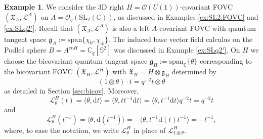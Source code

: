 \documentclass{article}
\theoremstyle{definition}
\newtheorem{example}[thm]{Example}
\newcommand{\fg}{{\mathfrak{g}}}
\begin{document}
\begin{example}
	We consider the 3D right $H=\mathcal{O}(U(1))$-covariant FOVC $(\mathfrak{X}_A,\mathscr{L}^A)$ on $A=\mathcal{O}_q(\mathrm{SL}_2(\mathbb{C}))$, as discussed in Examples \ref{ex:SL2:FOVC} and \ref{ex:SLq2'}. Recall that $(\mathfrak{X}_A,\mathscr{L}^A)$ is also a left $A$-covariant FOVC with quantum tangent space $\fg_A:=\mathrm{span}\{\chi_0,\chi_{\pm}\}$. The induced base vector field calculus on the Podle\'s sphere $B=A^{\mathrm{co}H}=\mathbb{C}_q[\mathbb{S}^2]$ was discussed in Example \ref{ex:SLq2'}. On $H$ we choose the bicovariant quantum tangent space $\mathfrak{g}_H:=\mathrm{span}_\mathbb{C}\{\theta\}$ corresponding to the bicovariant FOVC $(\mathfrak{X}_H,\mathscr{L}^H)$ with $\mathfrak{X}_H=H\otimes\mathfrak{g}_H$ determined by
	$$
	(1\otimes\theta)\cdot t=q^{-2}t\otimes\theta
	$$ 
	as detailed in Section \ref{sec:bicov}.
	Moreover, 
	$$
	\mathscr{L}^H_\theta(t)
	=\langle\theta,\mathrm{d}t\rangle
	=\langle\theta,tt^{-1}\mathrm{d}t\rangle
	=\langle\theta,t^{-1}\mathrm{d}t\rangle q^{-2}t
	=q^{-2}t
	$$
	and 
	$$
	\mathscr{L}^H_\theta(t^{-1})
	=\langle\theta,\mathrm{d}(t^{-1})\rangle
	=-\langle\theta,t^{-1}\mathrm{d}(t)t^{-1}\rangle
	=-t^{-1},
	$$
	where, to ease the notation, we write $\mathscr{L}^H_{\theta}$ in place of
	$\mathscr{L}^H_{1\otimes \theta}$.
	

\end{example}
\end{document}
